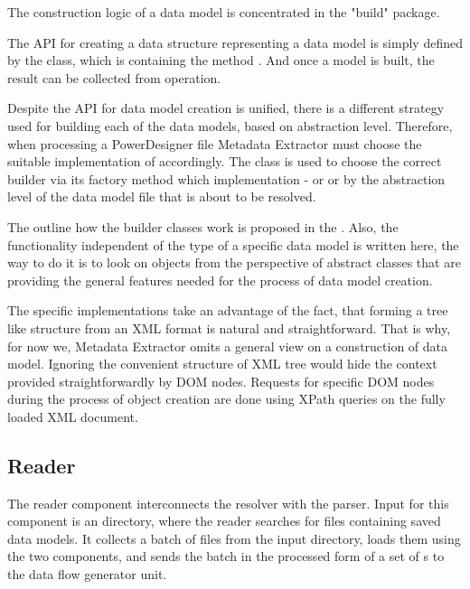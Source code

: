 The construction logic of a data model is concentrated in the "build" package.

The API for creating a data structure representing a data model is simply defined by the   class, which is containing the method . And once a model is built, the result can be collected from  operation.

Despite the API for data model creation is unified, there is a different strategy used for building each of the data models, based on abstraction level. 
Therefore, when processing a PowerDesigner file Metadata Extractor must choose the suitable implementation of  accordingly. 
The class  is used to choose the correct builder via its factory method which implementation -  or  or  by the abstraction level of the data model file that is about to be resolved.

The outline how the builder classes work is proposed in the . 
Also, the functionality independent of the type of a specific data model is written here, the way to do it is to look on objects from the perspective of abstract classes that are providing the general features needed for the process of data model creation.

The specific implementations take an advantage of the fact, that forming a tree like structure from an XML format is natural and straightforward. That is why, for now we, Metadata Extractor omits a general view on a construction of data model. Ignoring the convenient structure of XML tree would hide the context provided straightforwardly by DOM nodes. 
Requests for specific DOM nodes during the process of object creation are done using XPath queries on the fully loaded XML document.

\subsection{Reader}

The reader component interconnects the resolver with the parser. Input for this component is an directory, where the reader searches for files containing saved data models. It collects a batch of files from the input directory, loads them using the two components, and sends the batch in the processed form of a set of s to the data flow generator unit.

